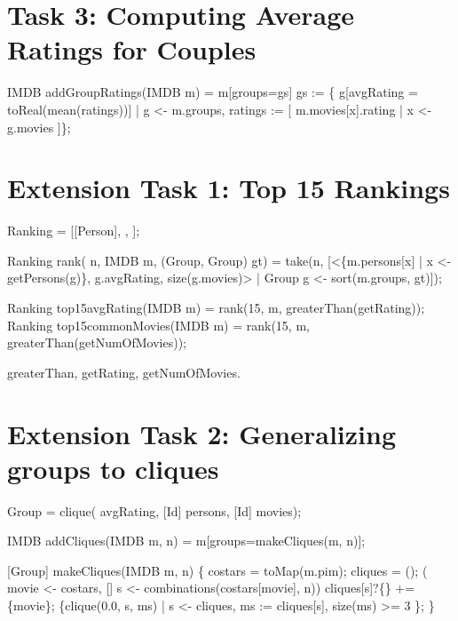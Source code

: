 \documentclass[submission,copyright,creativecommons]{eptcs}
\begin{document}
\section{Task 3: Computing Average Ratings for Couples}

\begin{rascal}
IMDB addGroupRatings(IMDB m) = m{}[groups=gs]
   gs :=
    \{{} g{}[avgRating = toReal(mean(ratings))] 
       | g \textless{}- m.groups, ratings := {}[ m.movies{}[x].rating | x \textless{}- g.movies ]\}{};
\end{rascal}

\section{Extension Task 1: Top 15 Rankings}

\begin{rascal}
 Ranking = [[Person], , ]; 

Ranking rank( n, IMDB m, (Group, Group) gt) =
    take(n, 
       {}[\textless{}\{{}m.persons{}[x] | x \textless{}- getPersons(g)\}{}, g.avgRating, size(g.movies)\textgreater{} 
            | Group g \textless{}- sort(m.groups, gt)]);
\end{rascal}    


\begin{rascal}
Ranking top15avgRating(IMDB m)    = rank(15, m, greaterThan(getRating));    
Ranking top15commonMovies(IMDB m) = rank(15, m, greaterThan(getNumOfMovies));
\end{rascal}

greaterThan, getRating, getNumOfMovies.

\section{Extension Task 2: Generalizing groups to cliques}

\begin{rascal}
 Group = clique( avgRating, [Id] persons, [Id] movies);
\end{rascal}


\begin{rascal}
IMDB addCliques(IMDB m,  n) = m{}[groups=makeCliques(m, n)];

[Group] makeCliques(IMDB m,  n) \{{}
    costars = toMap(m.pim); cliques = ();
     ( movie \textless{}- costars, [] s \textless{}- combinations(costars{}[movie], n))
      cliques{}[s]?\{\} += \{{}movie\}{};
     \{{}clique(0.0, s, ms) | s \textless{}- cliques, ms := cliques{}[s], size(ms) \textgreater{}= 3 \}{};
\}{}
\end{rascal}
\end{document}
